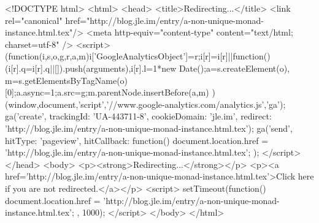 <!DOCTYPE html>
<html>
<head>
<title>Redirecting...</title>
<link rel="canonical" href="http://blog.jle.im/entry/a-non-unique-monad-instance.html.tex"/>
<meta http-equiv="content-type" content="text/html; charset=utf-8" />
<script>
(function(i,s,o,g,r,a,m){i['GoogleAnalyticsObject']=r;i[r]=i[r]||function(){
(i[r].q=i[r].q||[]).push(arguments)},i[r].l=1*new Date();a=s.createElement(o),
m=s.getElementsByTagName(o)[0];a.async=1;a.src=g;m.parentNode.insertBefore(a,m)
})(window,document,'script','//www.google-analytics.com/analytics.js','ga');
ga('create', { trackingId: 'UA-443711-8', cookieDomain: 'jle.im', redirect: 'http://blog.jle.im/entry/a-non-unique-monad-instance.html.tex'});
ga('send', { hitType: 'pageview', hitCallback: function() { document.location.href = 'http://blog.jle.im/entry/a-non-unique-monad-instance.html.tex'; } });
</script>
</head>
<body>
  <p><strong>Redirecting...</strong></p>
  <p><a href='http://blog.jle.im/entry/a-non-unique-monad-instance.html.tex'>Click here if you are not redirected.</a></p>
  <script>
    setTimeout(function() { document.location.href = 'http://blog.jle.im/entry/a-non-unique-monad-instance.html.tex'; }, 1000);
  </script>
</body>
</html>
